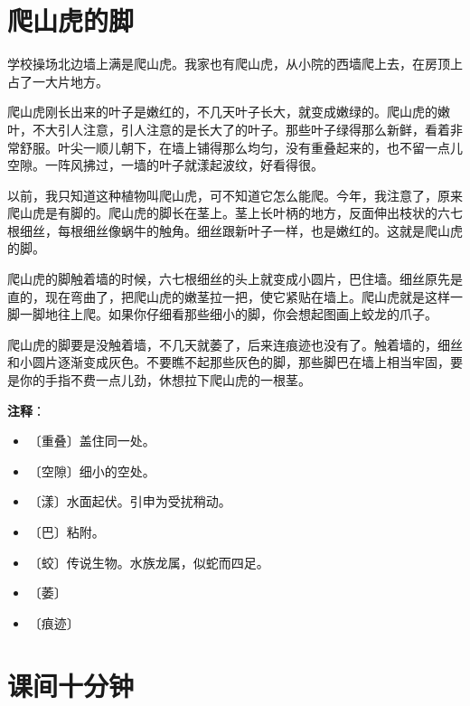 \documentclass[12pt,UTF-8,openany]{ctexbook}
\begin{document}
\chapter{爬山虎的脚}

\begin{large}
    
    学校操场北边墙上满是爬山虎。我家也有爬山虎，从小院的西墙爬上去，在房顶上占了一大片地方。
    
    爬山虎刚长出来的叶子是嫩红的，不几天叶子长大，就变成嫩绿的。爬山虎的嫩叶，不大引人注意，引人注意的是长大了的叶子。那些叶子绿得那么新鲜，看着非常舒服。叶尖一顺儿朝下，在墙上铺得那么均匀，没有重叠起来的，也不留一点儿空隙。一阵风拂过，一墙的叶子就漾起波纹，好看得很。
    
    以前，我只知道这种植物叫爬山虎，可不知道它怎么能爬。今年，我注意了，原来爬山虎是有脚的。爬山虎的脚长在茎上。茎上长叶柄的地方，反面伸出枝状的六七根细丝，每根细丝像蜗牛的触角。细丝跟新叶子一样，也是嫩红的。这就是爬山虎的脚。
    
    爬山虎的脚触着墙的时候，六七根细丝的头上就变成小圆片，巴住墙。细丝原先是直的，现在弯曲了，把爬山虎的嫩茎拉一把，使它紧贴在墙上。爬山虎就是这样一脚一脚地往上爬。如果你仔细看那些细小的脚，你会想起图画上蛟龙的爪子。
    
    爬山虎的脚要是没触着墙，不几天就萎了，后来连痕迹也没有了。触着墙的，细丝和小圆片逐渐变成灰色。不要瞧不起那些灰色的脚，那些脚巴在墙上相当牢固，要是你的手指不费一点儿劲，休想拉下爬山虎的一根茎。
    
\end{large}


\newpage

\textbf{注释}：

\vspace{-1em}

\begin{itemize}
    \setlength\itemsep{-0.2em}
    \item 〔重叠〕盖住同一处。
    \item 〔空隙〕细小的空处。
    \item 〔漾〕水面起伏。引申为受扰稍动。
    \item 〔巴〕粘附。
    \item 〔蛟〕传说生物。水族龙属，似蛇而四足。
    \item 〔萎〕
    \item 〔痕迹〕
\end{itemize}

\chapter{课间十分钟}
\end{document}
